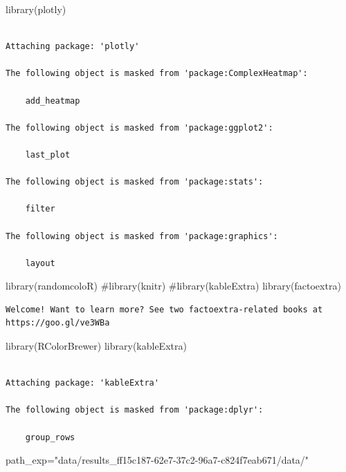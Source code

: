 \documentclass[
  letterpaper,
  DIV=11,
  numbers=noendperiod]{scrreprt}
\newenvironment{Shaded}{\begin{snugshade}}{\end{snugshade}}
\newcommand{\CommentTok}[1]{\textcolor[rgb]{0.37,0.37,0.37}{#1}}
\newcommand{\FunctionTok}[1]{\textcolor[rgb]{0.28,0.35,0.67}{#1}}
\newcommand{\NormalTok}[1]{\textcolor[rgb]{0.00,0.23,0.31}{#1}}
\newcommand{\OtherTok}[1]{\textcolor[rgb]{0.00,0.23,0.31}{#1}}
\newcommand{\StringTok}[1]{\textcolor[rgb]{0.13,0.47,0.30}{#1}}
\begin{document}
\begin{Shaded}
\begin{Highlighting}[]
\FunctionTok{library}\NormalTok{(plotly)}
\end{Highlighting}
\end{Shaded}

\begin{verbatim}

Attaching package: 'plotly'

The following object is masked from 'package:ComplexHeatmap':

    add_heatmap

The following object is masked from 'package:ggplot2':

    last_plot

The following object is masked from 'package:stats':

    filter

The following object is masked from 'package:graphics':

    layout
\end{verbatim}

\begin{Shaded}
\begin{Highlighting}[]
\FunctionTok{library}\NormalTok{(randomcoloR)}
\CommentTok{\#library(knitr)}
\CommentTok{\#library(kableExtra)}
\FunctionTok{library}\NormalTok{(factoextra)}
\end{Highlighting}
\end{Shaded}

\begin{verbatim}
Welcome! Want to learn more? See two factoextra-related books at https://goo.gl/ve3WBa
\end{verbatim}

\begin{Shaded}
\begin{Highlighting}[]
\FunctionTok{library}\NormalTok{(RColorBrewer)}
\FunctionTok{library}\NormalTok{(kableExtra)}
\end{Highlighting}
\end{Shaded}

\begin{verbatim}

Attaching package: 'kableExtra'

The following object is masked from 'package:dplyr':

    group_rows
\end{verbatim}

\begin{Shaded}
\begin{Highlighting}[]
\NormalTok{path\_exp}\OtherTok{=}\StringTok{"data/results\_ff15c187{-}62e7{-}37c2{-}96a7{-}c824f7eab671/data/"}
\end{Highlighting}
\end{Shaded}
\end{document}
